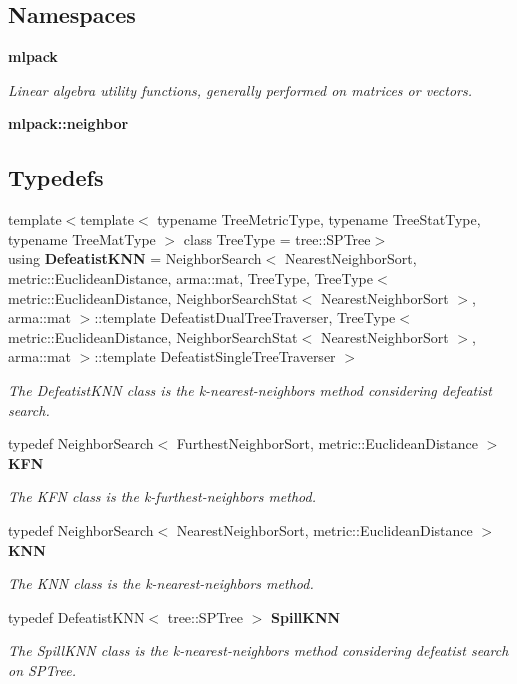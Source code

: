 \subsection*{Namespaces}
\begin{DoxyCompactItemize}
\item 
 \textbf{ mlpack}
\begin{DoxyCompactList}\small\item\em Linear algebra utility functions, generally performed on matrices or vectors. \end{DoxyCompactList}\item 
 \textbf{ mlpack\+::neighbor}
\end{DoxyCompactItemize}
\subsection*{Typedefs}
\begin{DoxyCompactItemize}
\item 
{\footnotesize template$<$template$<$ typename Tree\+Metric\+Type, typename Tree\+Stat\+Type, typename Tree\+Mat\+Type $>$ class Tree\+Type = tree\+::\+S\+P\+Tree$>$ }\\using \textbf{ Defeatist\+K\+NN} = Neighbor\+Search$<$ Nearest\+Neighbor\+Sort, metric\+::\+Euclidean\+Distance, arma\+::mat, Tree\+Type, Tree\+Type$<$ metric\+::\+Euclidean\+Distance, Neighbor\+Search\+Stat$<$ Nearest\+Neighbor\+Sort $>$, arma\+::mat $>$\+::template Defeatist\+Dual\+Tree\+Traverser, Tree\+Type$<$ metric\+::\+Euclidean\+Distance, Neighbor\+Search\+Stat$<$ Nearest\+Neighbor\+Sort $>$, arma\+::mat $>$\+::template Defeatist\+Single\+Tree\+Traverser $>$
\begin{DoxyCompactList}\small\item\em The Defeatist\+K\+NN class is the k-\/nearest-\/neighbors method considering defeatist search. \end{DoxyCompactList}\item 
typedef Neighbor\+Search$<$ Furthest\+Neighbor\+Sort, metric\+::\+Euclidean\+Distance $>$ \textbf{ K\+FN}
\begin{DoxyCompactList}\small\item\em The K\+FN class is the k-\/furthest-\/neighbors method. \end{DoxyCompactList}\item 
typedef Neighbor\+Search$<$ Nearest\+Neighbor\+Sort, metric\+::\+Euclidean\+Distance $>$ \textbf{ K\+NN}
\begin{DoxyCompactList}\small\item\em The K\+NN class is the k-\/nearest-\/neighbors method. \end{DoxyCompactList}\item 
typedef Defeatist\+K\+NN$<$ tree\+::\+S\+P\+Tree $>$ \textbf{ Spill\+K\+NN}
\begin{DoxyCompactList}\small\item\em The Spill\+K\+NN class is the k-\/nearest-\/neighbors method considering defeatist search on S\+P\+Tree. \end{DoxyCompactList}\end{DoxyCompactItemize}


